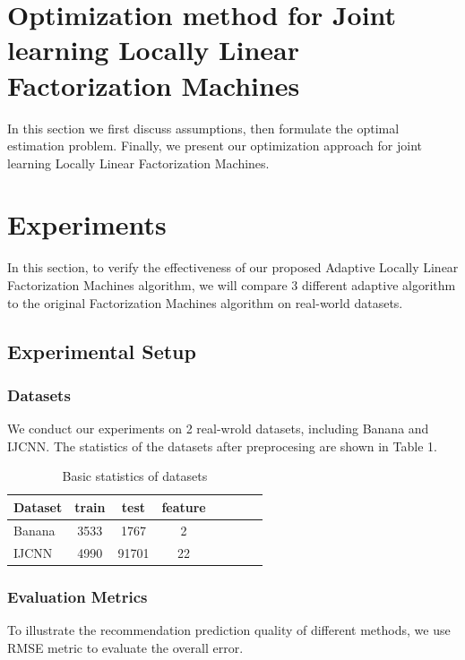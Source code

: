 \documentclass{article}
\begin{document}
\section{Optimization method for Joint learning Locally Linear Factorization Machines}
In this section we first discuss assumptions, then formulate the optimal estimation problem. Finally, we present our optimization approach for joint learning Locally Linear Factorization Machines.

\section{Experiments}
In this section, to verify the effectiveness of our proposed Adaptive Locally Linear Factorization Machines algorithm, we will compare 3 different adaptive algorithm to the original Factorization Machines algorithm on real-world datasets.
\subsection{Experimental Setup}
\subsubsection{Datasets}
We conduct our experiments on 2 real-wrold datasets, including Banana and IJCNN. The statistics of the datasets after preprocesing are shown in Table 1.
\begin{table}
	\caption{Basic statistics of datasets}
	\begin{tabular}{l*{6}{c}r}
		\hline
		Dataset              & train & test & feature \\
		\hline
		Banana 		   	& 3533 & 1767 & 2  \\
		IJCNN     	& 4990 & 91701 & 22   \\
	\end{tabular}
\end{table}
\subsubsection{Evaluation Metrics}
To illustrate the recommendation prediction quality of different methods, we use RMSE metric to evaluate the overall error.
\end{document}
